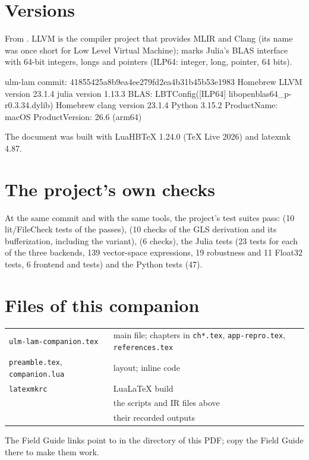 \section{Versions}

From . LLVM is the compiler project that
provides MLIR and Clang (its name was once short for Low Level Virtual
Machine);  marks Julia's BLAS interface with 64-bit
integers, longs and pointers (ILP64: integer, long, pointer, 64 bits).

\begin{textout}
ulm-lam commit: 41855425a8b9ea4ee279fd2ea4b31b45b53e1983
Homebrew LLVM version 23.1.4
julia version 1.13.3
BLAS: LBTConfig([ILP64] libopenblas64_p-r0.3.34.dylib)
Homebrew clang version 23.1.4
Python 3.15.2
ProductName: macOS  ProductVersion: 26.6  (arm64)
\end{textout}

The document was built with LuaHBTeX 1.24.0 (TeX Live 2026) and latexmk
4.87.

\section{The project's own checks}

At the same commit and with the same tools, the project's test suites
pass:  (10 lit/FileCheck tests of the passes),
 (10 checks of the GLS derivation and its
bufferization, including the  variant),  (6
checks), the Julia tests (23 tests for each of the three backends, 139
vector-space expressions, 19 robustness and 11 Float32 tests, 6 frontend
and  tests) and the Python tests (47).

\section{Files of this companion}

\begin{center}\small
\begin{tabularx}{\linewidth}{@{}lL@{}}
\toprule
\texttt{ulm-lam-companion.tex} & main file; chapters in \texttt{ch*.tex}, \texttt{app-repro.tex}, \texttt{references.tex} \\
\texttt{preamble.tex}, \texttt{companion.lua} & layout; inline code \\
\texttt{latexmkrc} & LuaLaTeX build \\
 & the scripts and IR files above \\
 & their recorded outputs \\
\bottomrule
\end{tabularx}
\end{center}

The Field Guide links point to \texttt{\FGfile} in the directory of this
PDF; copy the Field Guide there to make them work.
